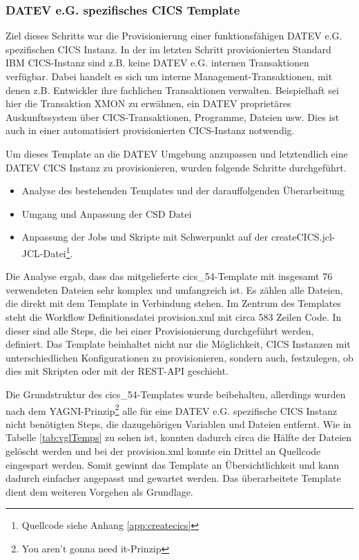 \subsubsection{DATEV e.G. spezifisches CICS Template}\label{sssec:datevcics}
Ziel dieses  Schritts war die Provisionierung einer funktionsfähigen DATEV e.G. spezifischen CICS Instanz. 
In der im letzten Schritt provisionierten Standard IBM CICS-Instanz sind z.B. keine DATEV e.G. internen Transaktionen verfügbar.
Dabei handelt es sich um interne Management-Transaktionen, mit denen z.B. Entwickler ihre fachlichen Transaktionen verwalten. 
Beispielhaft sei hier die Transaktion XMON zu erwähnen, ein DATEV proprietäres Auskunftssystem über CICS-Transaktionen, Programme, Dateien usw.
Dies ist auch in einer automatisiert provisionierten CICS-Instanz notwendig.

Um dieses Template an die DATEV Umgebung anzupassen und letztendlich eine \glqq DATEV CICS Instanz\grqq{} zu provisionieren, wurden folgende Schritte durchgeführt.

\begin{samepage}
\begin{itemize}
\item Analyse des bestehenden Templates und der darauffolgenden Überarbeitung 
\item Umgang und Anpassung der CSD Datei
\item Anpassung der Jobs und Skripte mit Schwerpunkt auf der \glqq createCICS.jcl\grqq-JCL-Datei\footnote{Quellcode siehe Anhang \ref{app:createcics}}.
\end{itemize}
\end{samepage}

Die Analyse ergab, dass das mitgelieferte \glqq cics\_54\grqq-Template mit insgesamt 76 verwendeten Dateien sehr komplex und umfangreich ist.
Es zählen alle Dateien, die direkt mit dem Template in Verbindung stehen.
Im Zentrum des Templates steht die Workflow Definitionsdatei \glqq provision.xml\grqq{} mit circa 583 Zeilen Code.
In dieser sind alle Steps, die bei einer Provisionierung durchgeführt werden, definiert.
Das Template beinhaltet nicht nur die Möglichkeit, CICS Instanzen mit unterschiedlichen Konfigurationen zu provisionieren, sondern auch, festzulegen, ob dies mit Skripten oder mit der REST-API geschieht.

Die Grundstruktur des \glqq cics\_54\grqq-Templates wurde beibehalten, allerdings wurden nach dem \glqq YAGNI\grqq-Prinzip\footnote{\glqq You aren't gonna need it\glqq-Prinzip} alle für eine DATEV e.G. spezifische CICS Instanz nicht benötigten Steps, die dazugehörigen Variablen und Dateien entfernt.
Wie in Tabelle \ref{tab:vglTemps} zu sehen ist, konnten dadurch circa die Hälfte der Dateien gelöscht werden und bei der provision.xml konnte ein Drittel an Quellcode eingespart werden.
Somit gewinnt das Template an Übersichtlichkeit und kann dadurch einfacher angepasst und gewartet werden.
Das überarbeitete Template dient dem weiteren Vorgehen als Grundlage.

